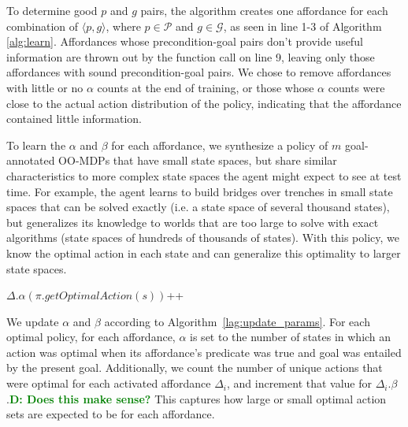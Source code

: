 \documentclass[conference]{IEEEtran}
\newcommand{\dnote}[1]{\textcolor{Green}{\textbf{D: #1}}}
\begin{document}
To determine good $p$ and $g$ pairs, the algorithm creates one affordance for 
each combination of $\langle p, g \rangle$, where $p \in \mathcal{P}$ and $g
\in \mathcal{G}$, as seen in line 1-3 of Algorithm \ref{alg:learn}. Affordances
whose precondition-goal pairs don't provide useful information are thrown out 
by the function call on line 9, leaving only those affordances with sound 
precondition-goal pairs. We chose to remove affordances with little or no $\alpha$
counts at the end of training, or those whose $\alpha$ counts were close to the 
actual action distribution of the policy, indicating that the affordance contained little 
information.

To learn the $\alpha$ and $\beta$ for each
affordance, we synthesize a policy of $m$ goal-annotated
OO-MDPs that have small state spaces, but share similar characteristics
to more complex state spaces the agent might expect to see at test time.
For example, the agent learns to build bridges over trenches in small state
spaces that can be solved exactly (i.e. a state space of several thousand states), but
generalizes its knowledge to worlds that are too large to solve with exact algorithms
(state spaces of hundreds of thousands of states). With this policy, we know the optimal 
action in each state and can generalize this optimality to larger state spaces.

\begin{algorithm}
  \caption{$updateParameters(knowledgeBase, \pi)$}
  \begin{algorithmic}[1]
    \State $\Delta.\alpha(\pi.getOptimalAction(s))$++
    \EndIf
    \EndFor
    \EndFor
  \end{algorithmic}
  \label{alg:update_params}
  \caption{\dnote{I need to add beta counts to this algorithm. It's a bit tricky to do concisely so I'm taking some time on it}}
\end{algorithm}

We update $\alpha$ and $\beta$ according to Algorithm~\ref{lag:update_params}.
For each optimal policy, for each affordance, $\alpha$ is set to the number of states
in which an action was optimal when its affordance's predicate was true and goal was
entailed by the present goal. Additionally, we count the number of unique actions that
were optimal for each activated affordance $\Delta_i$, and increment that value for
$\Delta_i.\beta$.\dnote{Does this make sense?} This captures how large or small optimal
action sets are expected to be for each affordance.
\end{document}
